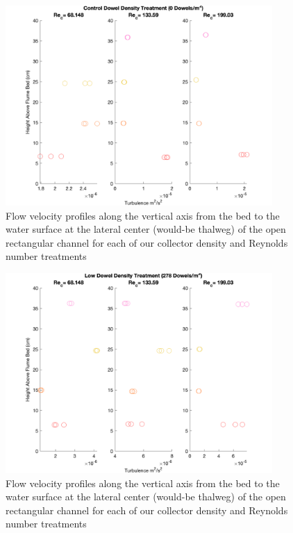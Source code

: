 \documentclass{article}
\begin{document}
\begin{figure}[H]
\includegraphics[width=4in]{pics/turb_control.png}
\centering
\caption{Flow velocity profiles along the vertical axis from the bed to the water surface at the lateral center (would-be thalweg) of the open rectangular channel for each of our collector density and Reynolds number treatments}
\label{fig:t1}
\end{figure}

\begin{figure}[H]
\includegraphics[width=4in]{pics/turb_low.png}
\centering
\caption{Flow velocity profiles along the vertical axis from the bed to the water surface at the lateral center (would-be thalweg) of the open rectangular channel for each of our collector density and Reynolds number treatments}
\label{fig:t2}
\end{figure}
\end{document}
